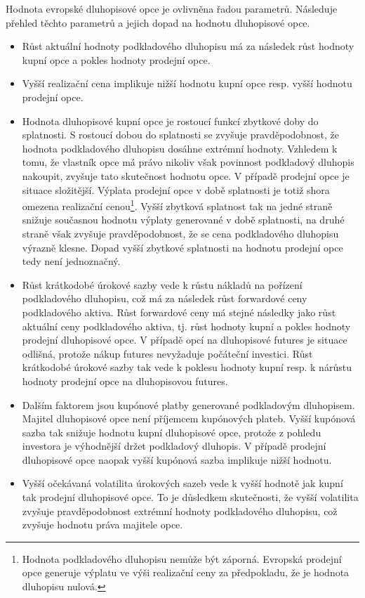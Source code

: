 \documentclass[a4paper]{book}
\begin{document}
Hodnota evropské dluhopisové opce je ovlivněna řadou parametrů. Následuje přehled těchto parametrů a jejich dopad na hodnotu dluhopisové opce.
\begin{itemize}
\item Růst aktuální hodnoty podkladového dluhopisu má za následek růst hodnoty kupní opce a pokles hodnoty prodejní opce.
\item Vyšší realizační cena implikuje nižší hodnotu kupní opce resp. vyšší hodnotu prodejní opce.
\item Hodnota dluhopisové kupní opce je rostoucí funkcí zbytkové doby do splatnosti. S rostoucí dobou do splatnosti se zvyšuje pravděpodobnost, že hodnota podkladového dluhopisu dosáhne extrémní hodnoty. Vzhledem k tomu, že vlastník opce má právo nikoliv však povinnost podkladový dluhopis nakoupit, zvyšuje tato skutečnost hodnotu opce. V případě prodejní opce je situace složitější. Výplata prodejní opce v době splatnosti je totiž shora omezena realizační cenou\footnote{Hodnota podkladového dluhopisu nemůže být záporná. Evropská prodejní opce generuje výplatu ve výši realizační ceny za předpokladu, že je hodnota dluhopisu nulová.}. Vyšší zbytková splatnost tak na jedné straně snižuje současnou hodnotu výplaty generované v době splatnosti, na druhé straně však zvyšuje pravděpodobnost, že se cena podkladového dluhopisu výrazně klesne. Dopad vyšší zbytkové splatnosti na hodnotu prodejní opce tedy není jednoznačný.
\item Růst krátkodobé úrokové sazby vede k růstu nákladů na pořízení podkladového dluhopisu, což má za následek růst forwardové ceny podkladového aktiva. Růst forwardové ceny má stejné následky jako růst aktuální ceny podkladového aktiva, tj. růst hodnoty kupní a pokles hodnoty prodejní dluhopisové opce. V případě opcí na dluhopisové futures je situace odlišná, protože nákup futures nevyžaduje počáteční investici. Růst krátkodobé úrokové sazby tak vede k poklesu hodnoty kupní resp. k nárůstu hodnoty prodejní opce na dluhopisovou futures.
\item Dalším faktorem jsou kupónové platby generované podkladovým dluhopisem. Majitel dluhopisové opce není příjemcem kupónových plateb. Vyšší kupónová sazba tak snižuje hodnotu kupní dluhopisové opce, protože z pohledu investora je výhodnější držet podkladový dluhopis. V případě prodejní dluhopisové opce naopak vyšší kupónová sazba implikuje nižší hodnotu.
\item Vyšší očekávaná volatilita úrokových sazeb vede k vyšší hodnotě jak kupní tak prodejní dluhopisové opce. To je důsledkem skutečnosti, že vyšší volatilita zvyšuje pravděpodobnost extrémní hodnoty podkladového dluhopisu, což zvyšuje hodnotu práva majitele opce.
\end{itemize}
\end{document}
